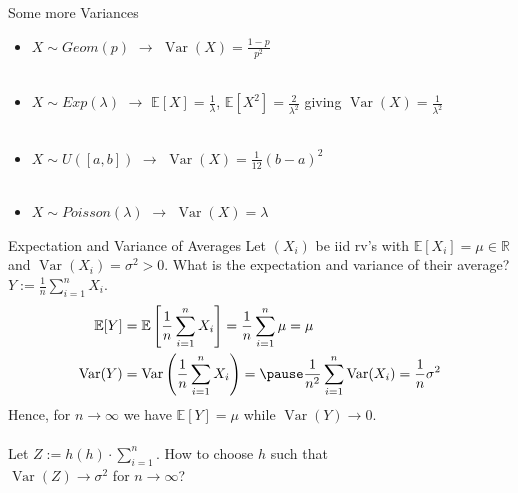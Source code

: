 \documentclass[11pt,pdf,ngerman,UKenglish]{beamer}%
\newcommand{\IR}{\mathds{R}}
\newcommand{\IE}{{\mathbb{E}}}
\newcommand{\1}{\mathbb{1}}
\newcommand{\Var}{\operatorname{Var}}
\theoremstyle{thm}
\theoremstyle{def}
\begin{document}
\begin{frame}{Some more Variances}
\begin{itemize}
\item $X \sim Geom(p)$ \pause $\to$ $\Var(X) = \frac{1-p}{p^2}$
\\ \
\item $X \sim Exp(\lambda)$ \pause $\to$ $\IE[X]=\frac1\lambda$, $\IE[X^2] = \frac{2}{\lambda^2}$ giving $\Var(X) = \frac{1}{\lambda^2}$
\\ \
\item $X \sim U([a,b])$ \pause $\to$ $\Var(X)= \frac{1}{12} (b-a)^2$
\\ \
\item $X \sim Poisson(\lambda)$ \pause $\to$ $\Var(X) = \lambda$
\end{itemize}
\end{frame}


\begin{frame}{Expectation and Variance of Averages}
Let $(X_i)$ be iid rv's with $\IE[X_i]=\mu \in \IR$ and $\Var(X_i)=\sigma^2 >0$. What is the expectation and variance of their average?
\\ $Y := \frac1n \sum_{i=1}^n X_i$.
\pause
\begin{align*}
\IE[Y] &= \IE \left[ \frac1n \sum_{i=1}^n X_i \right] = \frac{1}{n} \sum_{i=1}^n \mu = \mu
\\ 
\Var(Y) &= \Var \left( \frac1n \sum_{i=1}^n X_i \right) = \pause \frac{1}{n^2} \sum_{i=1}^n \Var(X_i) = \frac{1}{n} \sigma^2
\end{align*}
Hence, for $n \to \infty$ we have $\IE[Y] = \mu$ while $\Var(Y) \to 0$.
\\ \ \\ \pause
Let $Z:= h(h) \cdot \sum_{i=1}^n$. How to choose $h$ such that \\ $\Var(Z) \to \sigma^2$ for $n\to\infty$?
\vfill
\end{frame}


%
\end{document}
